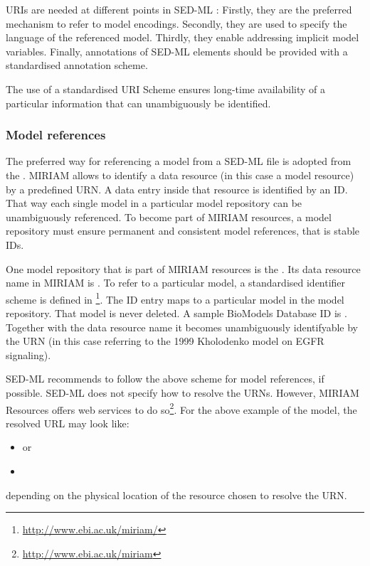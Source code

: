 \label{sec:uriScheme}

URIs are needed at different points in SED-ML \LoneVone: 
Firstly, they are the preferred mechanism to refer to model encodings. 
Secondly, they are used to specify the language of the referenced model.
Thirdly, they enable addressing implicit model variables.
Finally, annotations of SED-ML elements should be provided with a standardised annotation scheme.

The use of a standardised URI Scheme ensures long-time availability  of a particular information that can unambiguously be identified. 

\subsubsection{Model references}
\label{sec:modelURI}
The preferred way for referencing a model from a SED-ML file is adopted from the .
MIRIAM allows to identify  a data resource (in this case a model resource) by a predefined URN. A data entry inside that resource is identified by an ID. 
That way each single  model  in a particular model repository can be unambiguously referenced. To become part of MIRIAM resources, a model repository must ensure permanent and consistent model references, that is stable IDs.

One model repository that is part of MIRIAM resources is the  \citep{LDR+10}. Its data resource name in MIRIAM is . To refer to a particular model, a standardised identifier scheme is defined in \footnote{\url{http://www.ebi.ac.uk/miriam/}}. The ID entry maps to a particular model in the model repository. That model is never deleted. 
A sample BioModels Database ID is . Together with the data resource name it becomes unambiguously identifyable by the URN  (in this case referring to the 1999 Kholodenko model on EGFR signaling). 
%

SED-ML recommends to follow the above scheme for model references, if possible. 
SED-ML does not specify how to resolve the URNs. However, MIRIAM Resources offers web services to do so\footnote{\url{http://www.ebi.ac.uk/miriam}}. For the above example of the  model, the resolved URL may look like: 
\begin{itemize}
 \item{ or}
 \item{}
\end{itemize}
depending on the physical location of the resource chosen to resolve the URN.

